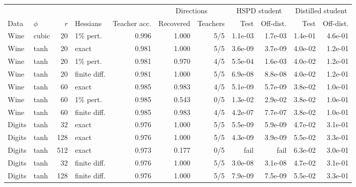 \begin{tabular}{l l r l r r r r r r r}
\toprule
& & & & & \multicolumn{2}{c}{Directions} & \multicolumn{2}{c}{HSPD student} & \multicolumn{2}{c}{Distilled student}\\
\cmidrule(lr){6-7}\cmidrule(lr){8-9}\cmidrule(lr){10-11}
Data & $\phi$ & $r$ & Hessians & Teacher acc. & Recovered & Teachers & Test & Off-dist. & Test & Off-dist.\\
\midrule
Wine & cubic & 20 & 1\% pert. & 0.996 & 1.000 & 5/5 & 1.1e-03 & 1.7e-03 & 1.4e-01 & 4.6e-01 \\
Wine & tanh & 20 & exact & 0.981 & 1.000 & 5/5 & 3.6e-09 & 3.7e-09 & 4.0e-02 & 1.2e-01 \\
Wine & tanh & 20 & 1\% pert. & 0.981 & 0.970 & 4/5 & 5.5e-04 & 1.6e-03 & 4.0e-02 & 1.2e-01 \\
Wine & tanh & 20 & finite diff. & 0.981 & 1.000 & 5/5 & 6.9e-08 & 8.8e-08 & 4.0e-02 & 1.2e-01 \\
Wine & tanh & 60 & exact & 0.985 & 0.983 & 4/5 & 5.1e-09 & 5.7e-09 & 3.8e-02 & 1.0e-01 \\
Wine & tanh & 60 & 1\% pert. & 0.985 & 0.543 & 0/5 & 1.3e-02 & 2.9e-02 & 3.8e-02 & 1.0e-01 \\
Wine & tanh & 60 & finite diff. & 0.985 & 0.983 & 4/5 & 4.2e-07 & 7.7e-07 & 3.8e-02 & 1.0e-01 \\
Digits & tanh & 32 & exact & 0.976 & 1.000 & 5/5 & 5.5e-09 & 5.9e-09 & 4.7e-02 & 3.1e-01 \\
Digits & tanh & 128 & exact & 0.976 & 1.000 & 5/5 & 4.3e-09 & 3.9e-09 & 5.5e-02 & 3.3e-01 \\
Digits & tanh & 512 & exact & 0.973 & 0.177 & 0/5 & fail & fail & 6.3e-02 & 3.0e-01 \\
Digits & tanh & 32 & finite diff. & 0.976 & 1.000 & 5/5 & 3.0e-08 & 3.1e-08 & 4.7e-02 & 3.1e-01 \\
Digits & tanh & 128 & finite diff. & 0.976 & 1.000 & 5/5 & 7.9e-09 & 7.5e-09 & 5.5e-02 & 3.3e-01 \\
\bottomrule
\end{tabular}
